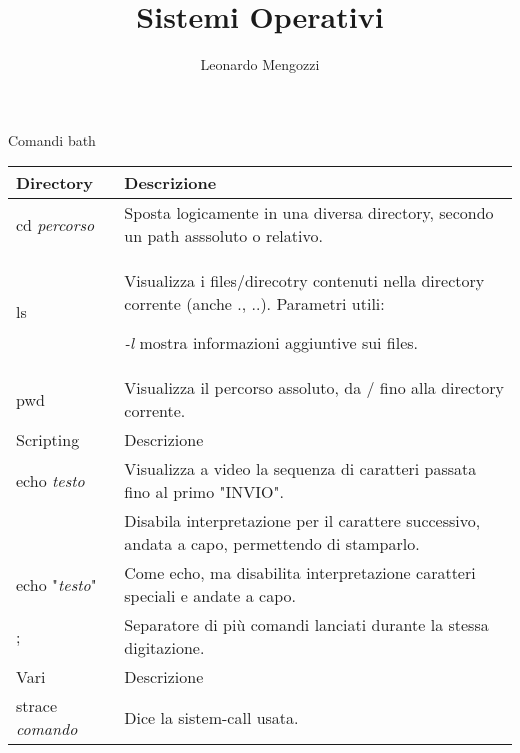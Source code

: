 \documentclass{article}
\title{Sistemi Operativi}
\author{Leonardo Mengozzi}
\date{}
\newcommand{\sezione}[1]{\hline#1 & Descrizione\\\hline}
\begin{document}
	\maketitle

	\centering
	{\large Comandi bath}\\[0.01\textheight]
	\begin{tabularx}{\textwidth}{lX}
	\sezione{Directory}
	cd \textit{percorso} & Sposta logicamente in una diversa directory, secondo un path asssoluto o relativo.\\
	ls & Visualizza i files/direcotry contenuti nella directory corrente (anche ., ..). Parametri utili:

	\textit{-l} mostra informazioni aggiuntive sui files.\\
	pwd & Visualizza il percorso assoluto, da / fino alla directory corrente.\\

	\sezione{Scripting}
	echo \textit{testo} & Visualizza a video la sequenza di caratteri passata fino al primo "INVIO".\\
	\ & Disabila interpretazione per il carattere successivo, andata a capo, permettendo di stamparlo.\\
	echo "\textit{testo}" & Come echo, ma disabilita interpretazione caratteri speciali e andate a capo.\\
	; & Separatore di più comandi lanciati durante la stessa digitazione.\\

	\sezione{Vari}
	strace \textit{comando} & Dice la sistem-call usata.\\
	\hline
	\end{tabularx}
\end{document}
